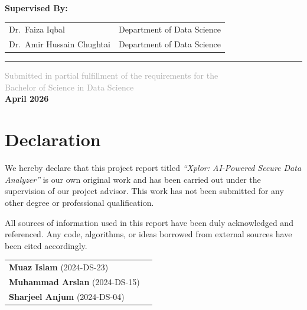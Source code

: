 \documentclass[12pt,a4paper]{report}
\begin{document}
\begin{titlepage}
\vspace{0.8cm}

{\large \textbf{Supervised By:}}\\[0.3cm]
\begin{tabular}{ll}
Dr.\ Faiza Iqbal        & Department of Data Science \\[0.15cm]
Dr.\ Amir Hussain Chughtai & Department of Data Science \\
\end{tabular}

\vspace{0.8cm}

\noindent\rule{\linewidth}{0.8pt}

{\normalsize \textcolor{darkgray}{Submitted in partial fulfillment of the requirements for the}}\\
{\normalsize \textcolor{darkgray}{Bachelor of Science in Data Science}}\\[0.4cm]
{\normalsize \textbf{April 2026}}

\end{titlepage}

\chapter*{Declaration}

We hereby declare that this project report titled \textit{``Xplor: AI-Powered Secure Data Analyzer''} is our own original work and has been carried out under the supervision of our project advisor. This work has not been submitted for any other degree or professional qualification.

All sources of information used in this report have been duly acknowledged and referenced. Any code, algorithms, or ideas borrowed from external sources have been cited accordingly.

\vspace{2cm}

\begin{tabular}{ll}
\textbf{Muaz Islam} (2024-DS-23) & \underline{\hspace{5cm}} \\[1.5cm]
\textbf{Muhammad Arslan} (2024-DS-15) & \underline{\hspace{5cm}} \\[1.5cm]
\textbf{Sharjeel Anjum} (2024-DS-04) & \underline{\hspace{5cm}} \\
\end{tabular}
\end{document}
